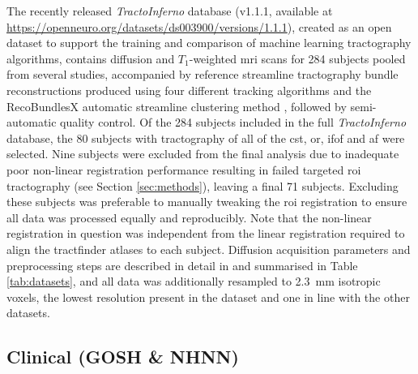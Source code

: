 \documentclass[12pt,phd,a4paper,twoside]{ucl_thesis}
\renewcommand{\textcite}[2][]{
\ifthenelse { \equal {#1} {} }  {\citeauthor{#2}\autocite{#2}}   {\citeauthor{#1}\autocite{#2}}}
\providecommand{\DIFaddtex}[1]{{\protect\color{blue} \sf #1}} %
\providecommand{\DIFdeltex}[1]{{\protect\color{red} \scriptsize #1}} %
\providecommand{\DIFaddbegin}{} %
\providecommand{\DIFaddend}{} %
\providecommand{\DIFdelbegin}{} %
\providecommand{\DIFdelend}{} %
\providecommand{\DIFadd}[1]{\texorpdfstring{\DIFaddtex{#1}}{#1}} %
\providecommand{\DIFdel}[1]{\texorpdfstring{\DIFdeltex{#1}}{}} %
\newcommand{\DIFscaledelfig}{0.5}
\newlength{\DIFdelgraphicswidth} %
\newlength{\DIFdelgraphicsheight} %
\newcommand{\DIFaddincludegraphics}[2][]{{\color{blue}\fbox{\DIFOincludegraphics[#1]{#2}}}} %
\newcommand{\DIFdelincludegraphics}[2][]{%
\sbox{\DIFdelgraphicsbox}{\DIFOincludegraphics[#1]{#2}}%
\settoboxwidth{\DIFdelgraphicswidth}{\DIFdelgraphicsbox} %
\settoboxtotalheight{\DIFdelgraphicsheight}{\DIFdelgraphicsbox} %
\scalebox{\DIFscaledelfig}{%
\parbox[b]{\DIFdelgraphicswidth}{\usebox{\DIFdelgraphicsbox}\\[-\baselineskip] \rule{\DIFdelgraphicswidth}{0em}}\llap{\resizebox{\DIFdelgraphicswidth}{\DIFdelgraphicsheight}{%
\setlength{\unitlength}{\DIFdelgraphicswidth}%
\begin{picture}(1,1)%
\thicklines\linethickness{2pt} %
{\color[rgb]{1,0,0}\put(0,0){\framebox(1,1){}}}%
{\color[rgb]{1,0,0}\put(0,0){\line( 1,1){1}}}%
{\color[rgb]{1,0,0}\put(0,1){\line(1,-1){1}}}%
\end{picture}%
}\hspace*{3pt}}} %
} %
\DeclareRobustCommand{\DIFaddbegin}{\DIFOaddbegin \let\includegraphics\DIFaddincludegraphics} %
\DeclareRobustCommand{\DIFaddend}{\DIFOaddend \let\includegraphics\DIFOincludegraphics} %
\DeclareRobustCommand{\DIFdelbegin}{\DIFOdelbegin \let\includegraphics\DIFdelincludegraphics} %
\DeclareRobustCommand{\DIFdelend}{\DIFOaddend \let\includegraphics\DIFOincludegraphics} %
\begin{document}
The recently released \textit{TractoInferno} database (v1.1.1, available at \url{https://openneuro.org/datasets/ds003900/versions/1.1.1})\autocite{Poulin2022a,Poulin2022}, created as an open dataset to support the training and comparison of machine learning tractography algorithms, contains diffusion and $T_1$-weighted \gls{mri} scans for 284 subjects pooled from several studies, accompanied by reference streamline tractography bundle reconstructions produced using four different tracking algorithms and the RecoBundlesX automatic streamline clustering method \autocite{Garyfallidis2018,Rheault2020a}, followed by semi-automatic quality control.
Of the 284 subjects included in the full \textit{TractoInferno} database, the 80 subjects with tractography of all of the \gls{cst}, \gls{or}, \gls{ifof} and \gls{af} were selected.
Nine subjects were excluded from the final analysis due to \DIFdelbegin \DIFdel{inadequate }\DIFdelend \DIFaddbegin \DIFadd{poor }\DIFaddend non-linear registration performance resulting in failed targeted \gls{roi} tractography (see Section \ref{sec:methods}), leaving a final 71 subjects.
\DIFaddbegin \DIFadd{Excluding these subjects was preferable to manually tweaking the }\gls{roi} \DIFadd{registration to ensure all data was processed equally and reproducibly.
Note that the non-linear registration in question was independent from the linear registration required to align the tractfinder atlases to each subject.
}\DIFaddend Diffusion acquisition parameters and preprocessing steps are described in detail in \textcite{Poulin2022} and summarised in Table \ref{tab:datasets}, and all data was additionally resampled to 2.3~mm isotropic voxels, the lowest resolution present in the dataset and one in line with the other datasets.

\subsection{Clinical (GOSH \& NHNN)}
\end{document}
